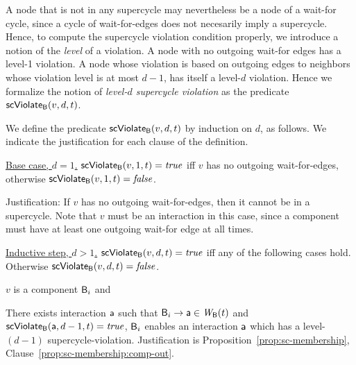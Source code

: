 A node that is not in any supercycle may nevertheless be a node of a wait-for cycle, since a cycle
of wait-for-edges does not necesarily imply a supercycle. Hence, to compute the supercycle violation
condition properly, we introduce a notion of the \emph{level} of a violation. A node with no
outgoing wait-for edges has a level-1 violation. A node whose violation is based on outgoing edges
to neighbors whose violation level is at most $d-1$, has itself a level-$d$ violation.  Hence we
formalize the notion of \emph{level-$d$ supercycle violation} as the predicate $\mathsf{scViolate}_{\mathsf{B}}(v,d,t)$.


\label{def:supercycle-violation}
\label{def:supercycle.violation}
We define the predicate $\mathsf{scViolate}_{\mathsf{B}}(v,d,t)$ by induction on $d$, as follows. We indicate the
justification for each clause of the definition.

\noindent
\ul{Base case, $d=1$.} $\mathsf{scViolate}_{\mathsf{B}}(v,1,t) = \mathit{true}$ iff $v$ has no outgoing wait-for-edges, otherwise $\mathsf{scViolate}_{\mathsf{B}}(v,1,t) = \mathit{false}$.

Justification: If $v$ has no outgoing wait-for-edges, then it cannot be in a supercycle.  Note that $v$ must be an
interaction in this case, since a component must have at least one outgoing wait-for edge at all times.

\noindent
\ul{Inductive step, $d > 1$.}  $\mathsf{scViolate}_{\mathsf{B}}(v,d,t) = \mathit{true}$ iff any of the following cases hold. Otherwise 
$\mathsf{scViolate}_{\mathsf{B}}(v,d,t) = \mathit{false}$.

\bn

\item $v$ is a component $\mathsf{B}_i$ and %
   \bn

   \item \label{def:supercycle.violation.component.out}
         There exists interaction $\mathsf{a}$ such that $\mathsf{B}_i \rightarrow \mathsf{a} \in \mathit{W}_{\mathsf{B}}({t})$ and $\mathsf{scViolate}_{\mathsf{B}}(\mathsf{a},d-1,t) = \mathit{true}$,
         \ie $\mathsf{B}_i$ enables an interaction $\mathsf{a}$ which has a level-$(d-1)$ supercycle-violation.
    Justification is Proposition~\ref{prop:sc-membership}, Clause~\ref{prop:sc-membership:comp-out}.


